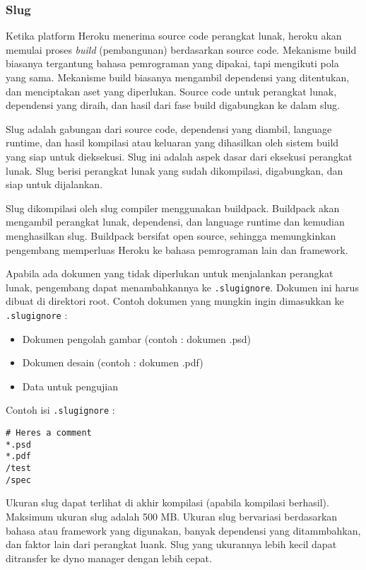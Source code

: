 \subsubsection{Slug}
Ketika platform Heroku menerima source code perangkat lunak, heroku akan memulai proses \textit{build} (pembangunan) berdasarkan source code. Mekanisme build biasanya tergantung bahasa pemrograman yang dipakai, tapi mengikuti pola yang sama. Mekanisme build biasanya mengambil dependensi yang ditentukan, dan menciptakan aset yang diperlukan. Source code untuk perangkat lunak, dependensi yang diraih, dan hasil dari fase build digabungkan ke dalam slug. 

Slug adalah gabungan dari source code, dependensi yang diambil, language runtime, dan hasil kompilasi atau keluaran yang dihasilkan oleh sistem build yang siap untuk dieksekusi. Slug ini adalah aspek dasar dari eksekusi perangkat lunak. Slug berisi perangkat lunak yang sudah dikompilasi, digabungkan, dan siap untuk dijalankan.

Slug dikompilasi oleh slug compiler menggunakan buildpack. Buildpack akan mengambil perangkat lunak, dependensi, dan language runtime dan kemudian menghasilkan slug. Buildpack bersifat open source, sehingga memungkinkan pengembang memperluas Heroku ke bahasa pemrograman lain dan framework.

Apabila ada dokumen yang tidak diperlukan untuk menjalankan perangkat lunak, pengembang dapat menambahkannya ke \texttt{.slugignore}. Dokumen ini harus dibuat di direktori root. Contoh dokumen yang mungkin ingin dimasukkan ke \texttt{.slugignore} :
\begin{itemize}
\item Dokumen pengolah gambar (contoh : dokumen .psd)
\item Dokumen desain (contoh : dokumen .pdf)
\item Data untuk pengujian
\end{itemize}

Contoh isi \texttt{.slugignore} :
\begin{lstlisting}
# Heres a comment
*.psd
*.pdf
/test
/spec
\end{lstlisting}

Ukuran slug dapat terlihat di akhir kompilasi (apabila kompilasi berhasil). Maksimum ukuran slug adalah 500 MB. Ukuran slug bervariasi berdasarkan bahasa atau framework yang digunakan, banyak dependensi yang ditammbahkan, dan faktor lain dari perangkat luank. Slug yang ukurannya lebih kecil dapat ditransfer ke dyno manager dengan lebih cepat.

